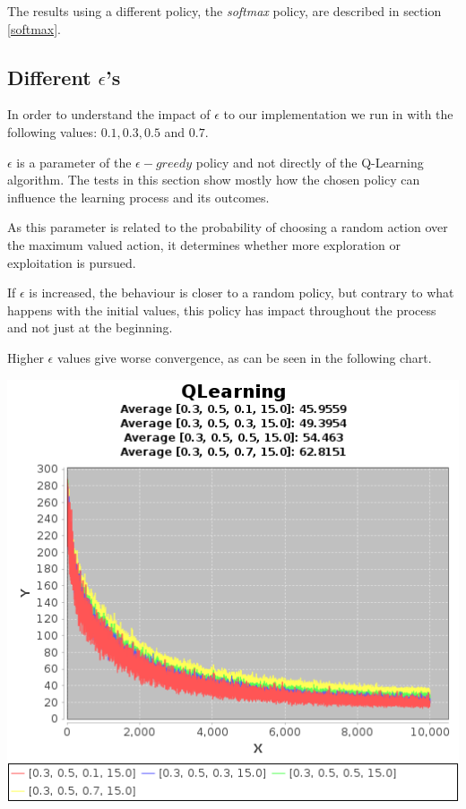 \documentclass{article}
\begin{document}
The results using a different policy, the \emph{softmax} policy, are described in section \ref{softmax}.

\subsection{Different $\epsilon$'s}
\label{ep}
In order to understand the impact of $\epsilon$ to our implementation we run
in with the following values:
$0.1, 0.3, 0.5$ and $0.7$.

$\epsilon$ is a parameter of the $\epsilon-greedy$ policy and not directly of the Q-Learning algorithm. The tests in this section show mostly how the chosen policy can
influence the learning process and its outcomes. 

As this parameter is related to the probability of choosing a random action over
the maximum valued action, it determines whether more exploration or exploitation is pursued.

If $\epsilon$ is increased, the behaviour is closer to a random
policy, but contrary to what happens with the initial values, this policy has
impact throughout the process and not just at the beginning.

Higher $\epsilon$ values give worse convergence, as can be seen in the following
chart.

\includegraphics[]{res/alpha_03_gama_05_epsilon_01_to_07_IV_15.png}
\end{document}
